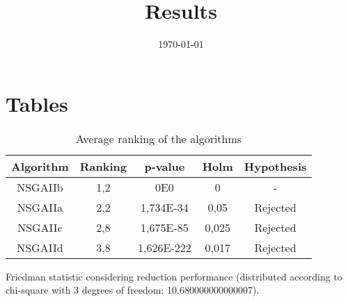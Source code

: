 \documentclass{article}
\title{Results}
\author{}
\date{\today}
\begin{document}
\oddsidemargin 0in \topmargin 0in\maketitle

\section{Tables}
\begin{table}[!htp]
\centering
\begin{tabular}{c|c|c|c|c}
Algorithm&Ranking&p-value&Holm&Hypothesis\\
\hline
NSGAIIb & 1,2 & 0E0 & 0 & -\\
NSGAIIa & 2,2 & 1,734E-34 & 0,05 & Rejected\\
NSGAIIc & 2,8 & 1,675E-85 & 0,025 & Rejected\\
NSGAIId & 3,8 & 1,626E-222 & 0,017 & Rejected\\
\end{tabular}
\caption{Average ranking of the algorithms}
\end{table}


Friedman statistic considering reduction performance (distributed according to chi-square with 3 degrees of freedom: 10.680000000000007).
\end{document}
